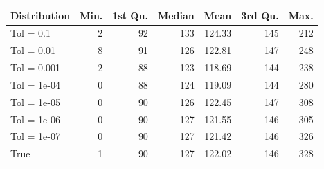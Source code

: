 \begin{figure} 
\begin{tabular}{lrrrrrr}
 Distribution & Min. & 1st Qu. & Median & Mean & 3rd Qu. & Max. \\ 
  \hline
\hline
Tol =  0.1 & 2 & 92 & 133 & 124.33 & 145 & 212 \\ 
  Tol =  0.01 & 8 & 91 & 126 & 122.81 & 147 & 248 \\ 
  Tol =  0.001 & 2 & 88 & 123 & 118.69 & 144 & 238 \\ 
  Tol =  1e-04 & 0 & 88 & 124 & 119.09 & 144 & 280 \\ 
  Tol =  1e-05 & 0 & 90 & 126 & 122.45 & 147 & 308 \\ 
  Tol =  1e-06 & 0 & 90 & 127 & 121.55 & 146 & 305 \\ 
  Tol =  1e-07 & 0 & 90 & 127 & 121.42 & 146 & 326 \\ 
  True & 1 & 90 & 127 & 122.02 & 146 & 328 \\ 
  \end{tabular}
\label{tab:SummaryTable}
\end{figure} 
